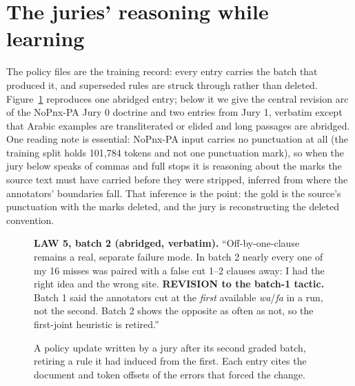 \documentclass[11pt]{article}
\begin{document}
\section{The juries' reasoning while learning}
\label{sec:learning}
The policy files are the training record: every entry carries the batch that produced
it, and superseded rules are struck through rather than deleted. Figure~\ref{fig:update}
reproduces one abridged entry; below it we give the central revision arc of the
NoPnx-PA Jury 0 doctrine and two entries from Jury 1, verbatim except that Arabic
examples are transliterated or elided and long passages are abridged. One reading note
is essential: NoPnx-PA input carries no punctuation at all (the training split holds
101{,}784 tokens and not one punctuation mark), so when the jury below speaks of
commas and full stops it is reasoning about the marks the source text must have
carried before they were stripped, inferred from where the annotators' boundaries
fall. That inference is the point: the gold is the source's punctuation with the marks
deleted, and the jury is reconstructing the deleted convention.
\begin{figure}[t]
\scriptsize
\begin{tcolorbox}[colback=white, boxrule=0.4pt, left=3pt, right=3pt, top=3pt, bottom=3pt]
\textbf{LAW 5, batch 2 (abridged, verbatim).}
``Off-by-one-clause remains a real, separate failure mode. In batch 2 nearly every one of
my 16 misses was paired with a false cut 1--2 clauses away: I had the right idea and the
wrong site. \textbf{REVISION to the batch-1 tactic.} Batch 1 said the annotators cut at the
\emph{first} available \textit{wa}/\textit{fa} in a run, not the second. Batch 2 shows the
opposite as often as not, so the first-joint heuristic is retired.''
\end{tcolorbox}
\caption{A policy update written by a jury after its second graded batch, retiring a
rule it had induced from the first. Each entry cites the document and token offsets of
the errors that forced the change.}
\label{fig:update}
\end{figure}
\end{document}
